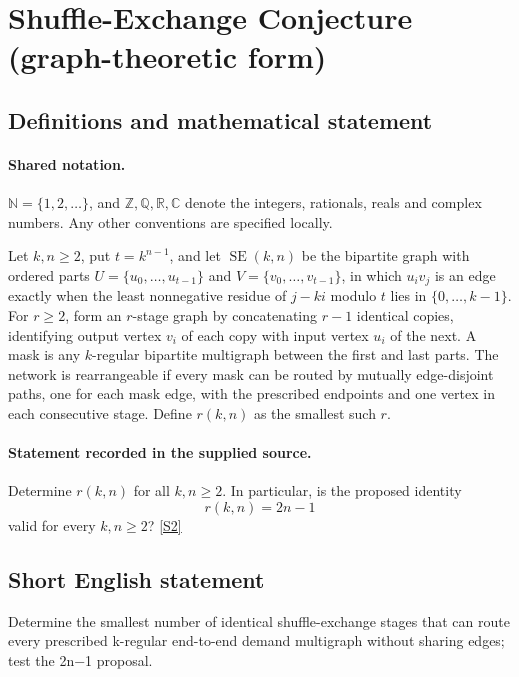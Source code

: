 \documentclass[11pt]{book}
\newcommand{\sref}[2]{\hyperlink{source:#1:#2}{[S#2]}}
\begin{document}
\section{Shuffle-Exchange Conjecture (graph-theoretic form)}\label{statement}

\subsection{Definitions and mathematical statement}

\paragraph{Shared notation.}$\mathbb N=\{1,2,\ldots\}$, and $\mathbb Z,\mathbb Q,\mathbb R,\mathbb C$ denote the integers, rationals, reals and complex numbers. Any other conventions are specified locally.


Let $k,n\geq2$, put $t=k^{n-1}$, and let $\operatorname{SE}(k,n)$ be the bipartite graph with ordered parts $U=\{u_0,\ldots,u_{t-1}\}$ and $V=\{v_0,\ldots,v_{t-1}\}$, in which $u_iv_j$ is an edge exactly when the least nonnegative residue of $j-ki$ modulo $t$ lies in $\{0,\ldots,k-1\}$. For $r\geq2$, form an $r$-stage graph by concatenating $r-1$ identical copies, identifying output vertex $v_i$ of each copy with input vertex $u_i$ of the next. A mask is any $k$-regular bipartite multigraph between the first and last parts. The network is rearrangeable if every mask can be routed by mutually edge-disjoint paths, one for each mask edge, with the prescribed endpoints and one vertex in each consecutive stage. Define $r(k,n)$ as the smallest such $r$.
\paragraph{Statement recorded in the supplied source.}
Determine $r(k,n)$ for all $k,n\geq2$. In particular, is the proposed identity
\[r(k,n)=2n-1\]
valid for every $k,n\geq2$? \sref{statement}{2}
\subsection{Short English statement}
Determine the smallest number of identical shuffle-exchange stages that can route every prescribed k-regular end-to-end demand multigraph without sharing edges; test the 2n−1 proposal.
\end{document}
